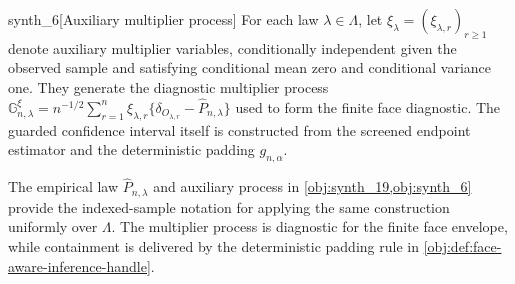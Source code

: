\documentclass[11pt]{article}
\begin{document}
\begin{definitionv}{synth_6}[Auxiliary multiplier process]
For each law $\lambda\in\Lambda$, let $\xi_\lambda=(\xi_{\lambda,r})_{r\ge1}$ denote auxiliary multiplier variables, conditionally independent given the observed sample and satisfying conditional mean zero and conditional variance one. They generate the diagnostic multiplier process $\mathbb G_{n,\lambda}^{\xi}=n^{-1/2}\sum_{r=1}^n\xi_{\lambda,r}\{\delta_{O_{\lambda,r}}-\widehat P_{n,\lambda}\}$ used to form the finite face diagnostic. The guarded confidence interval itself is constructed from the screened endpoint estimator and the deterministic padding $g_{n,\alpha}$.
\end{definitionv}

The empirical law \(\widehat P_{n,\lambda}\) and auxiliary process in \cref{obj:synth_19,obj:synth_6} provide the indexed-sample notation for applying the same construction uniformly over \(\Lambda\).  The multiplier process is diagnostic for the finite face envelope, while containment is delivered by the deterministic padding rule in \cref{obj:def:face-aware-inference-handle}.
\end{document}
